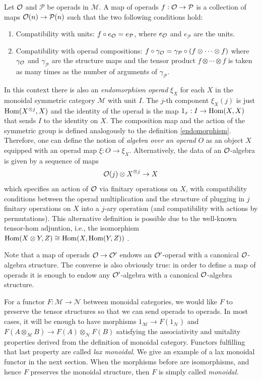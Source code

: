 \documentclass[TFM.tex]{subfiles}
\begin{document}
\begin{defi}
Let ${\mathcal O}$ and $\mathcal{P}$ be operads in $\mathscr{M}$. A map of operads $f:{\mathcal O}\to \mathcal{P}$ is a collection of maps ${\mathcal O}(n)\to \mathcal{P}(n)$ such that the two following conditions hold:
\begin{enumerate}
\item Compatibility with units:  $f\circ e_{\mathcal O}=e_\mathcal{P}$, where $e_{\mathcal O}$ and $e_\mathcal{P}$ are the units.
\item Compatibility with operad compositions: $f\circ \gamma_{\mathcal O}=\gamma_\mathcal{P}\circ (f\otimes\cdots\otimes f)$ where $\gamma_{\mathcal O}$ and $\gamma_\mathcal{P}$ are the structure maps and the tensor product $f\otimes\cdots\otimes f$ is taken as many times as the number of arguments of $\gamma_\mathcal{P}$. 
\end{enumerate}
\end{defi}



In this context there is also an \emph{endomorphism operad} $\xi_X$ for each $X$ in the monoidal symmetric category $\mathscr{M}$ with unit $I$. The $j$-th component $\xi_X(j)$ is just $\operatorname{Hom}(X^{\otimes j},X)$ and the identity of the operad is the map $1_x:I\to \operatorname{Hom}(X,X)$ that sends $I$ to the identity on $X$. The composition map and the action of the symmetric group is defined analogously to the definition \ref{endomorphism}. Therefore, one can define the notion of \emph{algebra over an operad} $O$ as an object $X$ equipped with an operad map $\xi:O\to\xi_X$. Alternatively, the data of an ${\mathcal O}$-algebra is given by a sequence of maps
\[
{\mathcal O}(j) \otimes X^{\otimes j} \to X
\]
which specifies an action of ${\mathcal O}$ via finitary operations on $X$, with compatibility conditions between the operad multiplication and the structure of plugging in $j$ finitary operations on $X$ into a $j$-ary operation (and compatibility with actions by permutations). This alternative definition is possible due to the well-known tensor-hom adjuntion, i.e., the isomorphism $\operatorname{Hom}(X\otimes Y,Z)\cong \operatorname{Hom}(X,\operatorname{Hom}(Y,Z))$ \cite{tensor-hom}.

Note that a map of operads ${\mathcal O}\to {\mathcal O}'$ endows an ${\mathcal O}'$-operad with a canonical ${\mathcal O}$-algebra structure. The converse is also obviously true: in order to define a map of operads it is enough to endow any ${\mathcal O}'$-algebra with a canonical ${\mathcal O}$-algebra structure. 

For a functor $F:\mathscr{M}\to\mathscr{N}$ between monoidal categories, we would like $F$ to preserve the tensor structures so that we can send operads to operads. In most cases, it will be enough to have  morphisms $1_{\mathscr{M}}\to F(1_\mathscr{N})$ and $F(A\otimes_{\mathscr{M}}B)\to F(A)\otimes_{\mathscr{N}} F(B)$ satisfying the associativity and unitality properties derived from the definition of monoidal category. Functors fulfilling that last property are called \emph{lax monoidal}. We give an example of a lax monoidal functor in the next section. When the morphisms before are isomorphisms, and hence $F$ preserves the monoidal structure, then $F$ is simply called \emph{monoidal}.
\end{document}
